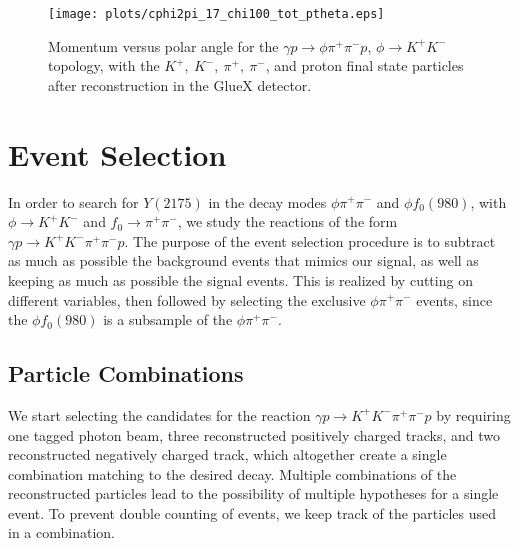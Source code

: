 \begin{center}
\null
\vfill
\begin{figure}[htbp]   
    \centering
        \texttt{[image: plots/cphi2pi\_17\_chi100\_tot\_ptheta.eps]}
        \caption{Momentum versus polar angle for the $\gamma p \rightarrow \phi \pi^+ \pi^- p$, $\phi \rightarrow K^+ K^-$ topology, with the $K^{+},~K^{-},~\pi^{+},~\pi^{-}$, and proton final state particles after reconstruction in the GlueX detector.}
        \label{fig.y2175.data_mc.mc}
\end{figure}
\null
\vfill
\end{center}

\section{Event Selection}
\label{chap.y2175.evt_sel}

In order to search for $Y(2175)$ in the decay modes $\phi \pi^+ \pi^-$ and $\phi f_0(980)$, with $\phi \rightarrow K^+ K^- $ and $f_0 \rightarrow \pi^+ \pi^-$, we study the reactions of the form $\gamma p \rightarrow K^+ K^- \pi^+ \pi^- p$. The purpose of the event selection procedure is to subtract as much as possible the background events that mimics our signal, as well as keeping as much as possible the signal events. This is realized by cutting on different variables, then followed by selecting the exclusive $\phi \pi^+ \pi^-$ events, since the $\phi f_0(980)$ is a subsample of the $\phi \pi^+ \pi^-$.

\subsection{Particle Combinations}
\label{chap.y2175.evt_sel.par_com}

We start selecting the candidates for the reaction $\gamma p \rightarrow K^+ K^- \pi^+ \pi^- p$ by requiring one tagged photon beam, three reconstructed positively charged tracks, and two reconstructed negatively charged track, which altogether create a single combination matching to the desired decay. Multiple combinations of the reconstructed particles lead to the possibility of multiple hypotheses for a single event. To prevent double counting of events, we keep track of the particles used in a combination.

